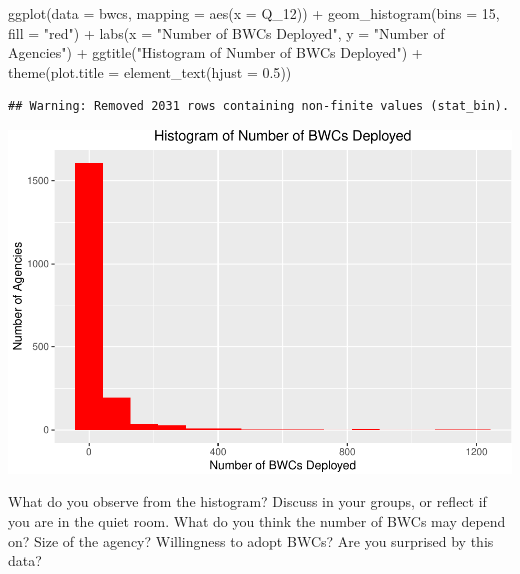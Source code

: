 \documentclass[
]{book}
\newenvironment{Shaded}{\begin{snugshade}}{\end{snugshade}}
\newcommand{\AttributeTok}[1]{\textcolor[rgb]{0.77,0.63,0.00}{#1}}
\newcommand{\DecValTok}[1]{\textcolor[rgb]{0.00,0.00,0.81}{#1}}
\newcommand{\FloatTok}[1]{\textcolor[rgb]{0.00,0.00,0.81}{#1}}
\newcommand{\FunctionTok}[1]{\textcolor[rgb]{0.00,0.00,0.00}{#1}}
\newcommand{\NormalTok}[1]{#1}
\newcommand{\SpecialCharTok}[1]{\textcolor[rgb]{0.00,0.00,0.00}{#1}}
\newcommand{\StringTok}[1]{\textcolor[rgb]{0.31,0.60,0.02}{#1}}
\begin{document}
\begin{Shaded}
\begin{Highlighting}[]
\FunctionTok{ggplot}\NormalTok{(}\AttributeTok{data =}\NormalTok{ bwcs, }\AttributeTok{mapping =} \FunctionTok{aes}\NormalTok{(}\AttributeTok{x =}\NormalTok{ Q\_12)) }\SpecialCharTok{+} 
  \FunctionTok{geom\_histogram}\NormalTok{(}\AttributeTok{bins =} \DecValTok{15}\NormalTok{, }\AttributeTok{fill =} \StringTok{"red"}\NormalTok{) }\SpecialCharTok{+} 
  \FunctionTok{labs}\NormalTok{(}\AttributeTok{x =} \StringTok{"Number of BWCs Deployed"}\NormalTok{, }\AttributeTok{y =} \StringTok{"Number of Agencies"}\NormalTok{) }\SpecialCharTok{+} 
  \FunctionTok{ggtitle}\NormalTok{(}\StringTok{"Histogram of Number of BWCs Deployed"}\NormalTok{) }\SpecialCharTok{+} 
  \FunctionTok{theme}\NormalTok{(}\AttributeTok{plot.title =} \FunctionTok{element\_text}\NormalTok{(}\AttributeTok{hjust =} \FloatTok{0.5}\NormalTok{))}
\end{Highlighting}
\end{Shaded}

\begin{verbatim}
## Warning: Removed 2031 rows containing non-finite values (stat_bin).
\end{verbatim}

\includegraphics{04-descriptive-statistics_files/figure-latex/unnamed-chunk-47-1.pdf}

What do you observe from the histogram? Discuss in your groups, or reflect if you are in the quiet room. What do you think the number of BWCs may depend on? Size of the agency? Willingness to adopt BWCs? Are you surprised by this data?
\end{document}
